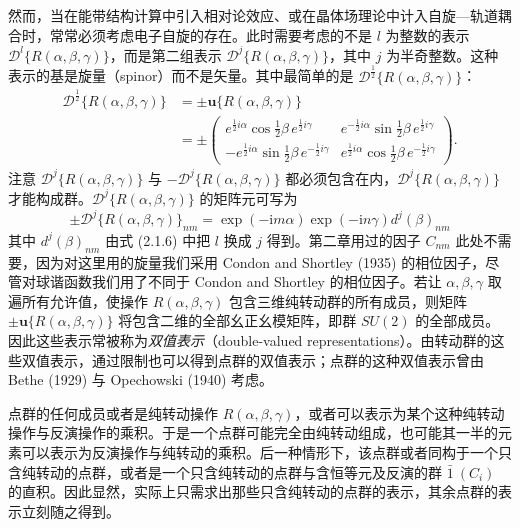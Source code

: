 然而，当在能带结构计算中引入相对论效应、或在晶体场理论中计入自旋—轨道耦合时，常常必须考虑电子自旋的存在。此时需要考虑的不是 $l$ 为整数的表示 $\mathcal{D}^{l}\{R(\alpha, \beta, \gamma)\}$，而是第二组表示 $\mathcal{D}^{j}\{R(\alpha, \beta, \gamma)\}$，其中 $j$ 为半奇整数。这种表示的基是旋量（spinor）而不是矢量。其中最简单的是 $\mathcal{D}^{\frac{1}{2}}\{R(\alpha, \beta, \gamma)\}$：
\begin{equation*}
\begin{array}{rl}
\mathcal{D}^{\frac{1}{2}}\{R(\alpha, \beta, \gamma)\} &= \pm\mathbf{u}\{R(\alpha, \beta, \gamma)\}\\
&= \pm\begin{pmatrix} e^{\frac{1}{2}i\alpha}\cos\frac{1}{2}\beta\, e^{\frac{1}{2}i\gamma} & e^{-\frac{1}{2}i\alpha}\sin\frac{1}{2}\beta\, e^{\frac{1}{2}i\gamma}\\ -e^{\frac{1}{2}i\alpha}\sin\frac{1}{2}\beta\, e^{-\frac{1}{2}i\gamma} & e^{\frac{1}{2}i\alpha}\cos\frac{1}{2}\beta\, e^{-\frac{1}{2}i\gamma} \end{pmatrix}.
\end{array}
\tag{6.1.1}
\end{equation*}
注意 $\mathcal{D}^{j}\{R(\alpha, \beta, \gamma)\}$ 与 $-\mathcal{D}^{j}\{R(\alpha, \beta, \gamma)\}$ 都必须包含在内，$\mathcal{D}^{j}\{R(\alpha, \beta, \gamma)\}$ 才能构成群。$\mathcal{D}^{j}\{R(\alpha, \beta, \gamma)\}$ 的矩阵元可写为
\begin{equation*}
\pm\mathcal{D}^{j}\{R(\alpha, \beta, \gamma)\}_{nm} = \exp(-\mathrm{i}m\alpha)\exp(-\mathrm{i}n\gamma)d^{j}(\beta)_{nm}
\tag{6.1.2}
\end{equation*}
其中 $d^{j}(\beta)_{nm}$ 由式 (2.1.6) 中把 $l$ 换成 $j$ 得到。第二章用过的因子 $C_{nm}$ 此处不需要，因为对这里用的旋量我们采用 Condon and Shortley (1935) 的相位因子，尽管对球谐函数我们用了不同于 Condon and Shortley 的相位因子。若让 $\alpha, \beta, \gamma$ 取遍所有允许值，使操作 $R(\alpha, \beta, \gamma)$ 包含三维纯转动群的所有成员，则矩阵 $\pm\mathbf{u}\{R(\alpha, \beta, \gamma)\}$ 将包含二维的全部幺正幺模矩阵，即群 $SU(2)$ 的全部成员。因此这些表示常被称为\textit{双值表示}（double-valued representations）。由转动群的这些双值表示，通过限制也可以得到点群的双值表示；点群的这种双值表示曾由 Bethe (1929) 与 Opechowski (1940) 考虑。

点群的任何成员或者是纯转动操作 $R(\alpha, \beta, \gamma)$，或者可以表示为某个这种纯转动操作与反演操作的乘积。于是一个点群可能完全由纯转动组成，也可能其一半的元素可以表示为反演操作与纯转动的乘积。后一种情形下，该点群或者同构于一个只含纯转动的点群，或者是一个只含纯转动的点群与含恒等元及反演的群 $\bar{1}\ (C_{i})$ 的直积。因此显然，实际上只需求出那些只含纯转动的点群的表示，其余点群的表示立刻随之得到。

